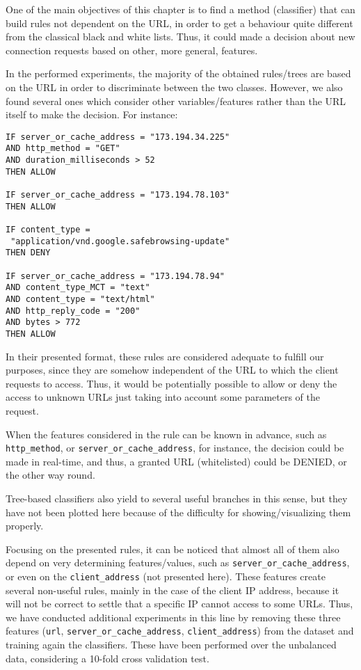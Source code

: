 \documentclass{llncs}
\begin{document}
One of the main objectives of this chapter is to find a method (classifier) that can build rules not dependent on the URL, in order to get a behaviour quite different from the classical black and white lists. Thus, it could made a decision about new connection requests based on other, more general, features.

In the performed experiments, the majority of the obtained rules/trees are based on the URL in order to discriminate between the two classes. However, we also found several ones which consider other variables/features rather than the URL itself to make the decision. For instance:\\

\begin{small}
\begin{verbatim}
IF server_or_cache_address = "173.194.34.225"
AND http_method = "GET"
AND duration_milliseconds > 52
THEN ALLOW

IF server_or_cache_address = "173.194.78.103"
THEN ALLOW

IF content_type =
 "application/vnd.google.safebrowsing-update"
THEN DENY

IF server_or_cache_address = "173.194.78.94"
AND content_type_MCT = "text"
AND content_type = "text/html"
AND http_reply_code = "200"
AND bytes > 772
THEN ALLOW
\end{verbatim}
\end{small}

In their presented format, these rules are considered adequate to fulfill our purposes, since they are somehow independent of the URL to which the client requests to access. Thus, it would be potentially possible to allow or deny the access to unknown URLs just taking into account some parameters of the request. 

When the features considered in the rule can be known in advance, such as \texttt{http\_method}, or \texttt{server\_or\_cache\_address}, for instance, the decision could be made in real-time, and thus, a granted URL (whitelisted) could be DENIED, or the other way round.

Tree-based classifiers also yield to several useful branches in this sense, but they have not been plotted here because of the difficulty for showing/visualizing them properly.

Focusing on the presented rules, it can be noticed that almost all of them also depend on very determining features/values, such as \texttt{server\_or\_cache\_address}, or even on the \texttt{client\_address} (not presented here). These features create several non-useful rules, mainly in the case of the client IP address, because it will not be correct to settle that a specific IP cannot access to some URLs. Thus, we have conducted additional experiments in this line by removing these three features (\texttt{url}, \texttt{server\_or\_cache\_address}, \texttt{client\_address}) from the dataset and training again the classifiers. These have been performed over the unbalanced data, considering a 10-fold cross validation test. 
\end{document}
